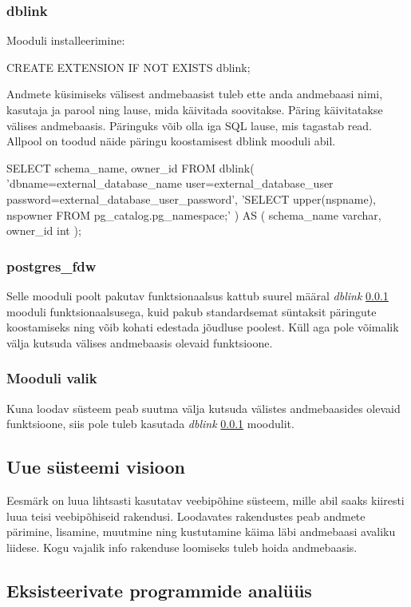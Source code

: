 \documentclass[a4paper,12pt]{article} %
\begin{document}
\subsubsection{dblink}
\label{dblink}
Mooduli installeerimine:
\begin{SQL}
CREATE EXTENSION IF NOT EXISTS dblink;
\end{SQL}
Andmete küsimiseks välisest andmebaasist tuleb ette anda andmebaasi nimi, kasutaja ja parool ning lause, mida käivitada soovitakse. Päring käivitatakse välises andmebaasis. Päringuks võib olla iga SQL lause, mis tagastab read.\cite{PostgreSQLdblink} Allpool on toodud näide päringu koostamisest dblink mooduli abil.
\begin{SQL}
SELECT schema_name, owner_id
FROM dblink(
  'dbname=external_database_name user=external_database_user password=external_database_user_password',
  'SELECT upper(nspname), nspowner FROM pg_catalog.pg_namespace;'
) AS (
  schema_name varchar,
  owner_id int
);
\end{SQL}

\subsubsection{postgres\_fdw}
Selle mooduli poolt pakutav funktsionaalsus kattub suurel määral \textit{dblink} \ref{dblink} mooduli funktsionaalsusega, kuid pakub standardsemat süntaksit päringute koostamiseks ning võib kohati edestada jõudluse poolest. Küll aga pole võimalik välja kutsuda välises andmebaasis olevaid funktsioone.
\cite{PostgreSQLfdw}

\subsubsection{Mooduli valik}
Kuna loodav süsteem peab suutma välja kutsuda välistes andmebaasides olevaid funktsioone, siis pole tuleb kasutada \textit{dblink} \ref{dblink} moodulit.

\subsection{Uue süsteemi visioon}
Eesmärk on luua lihtsasti kasutatav veebipõhine süsteem, mille abil saaks kiiresti luua teisi veebipõhiseid rakendusi. Loodavates rakendustes peab andmete pärimine, lisamine, muutmine ning kustutamine käima läbi andmebaasi avaliku liidese. Kogu vajalik info rakenduse loomiseks tuleb hoida andmebaasis.
\subsection{Eksisteerivate programmide analüüs}
\end{document}
